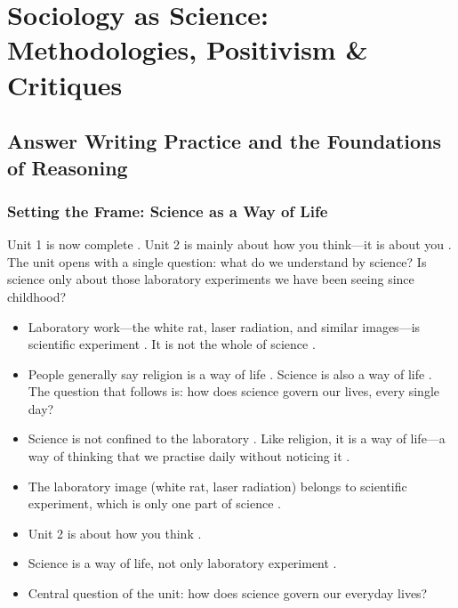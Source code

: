 
\chapter{Sociology as Science: Methodologies, Positivism \& Critiques}

\section{Answer Writing Practice and the Foundations of Reasoning}

\subsection{Setting the Frame: Science as a Way of Life}
Unit 1 is now complete . Unit 2 is mainly about how you think---it is about you . The unit opens with a single question: what do we understand by science? Is science only about those laboratory experiments we have been seeing since childhood? 
\begin{itemize}
    \item Laboratory work---the white rat, laser radiation, and similar images---is scientific experiment . It is not the whole of science .
    \item People generally say religion is a way of life . Science is also a way of life . The question that follows is: how does science govern our lives, every single day? 
\end{itemize}

\begin{KeyConcept}
\begin{itemize}
    \item Science is not confined to the laboratory . Like religion, it is a way of life---a way of thinking that we practise daily without noticing it .
    \item The laboratory image (white rat, laser radiation) belongs to scientific experiment, which is only one part of science .
\end{itemize}
\end{KeyConcept}

\begin{QuickRevision}
\begin{itemize}
    \item Unit 2 is about how you think .
    \item Science is a way of life, not only laboratory experiment .
    \item Central question of the unit: how does science govern our everyday lives? 
\end{itemize}
\end{QuickRevision}

